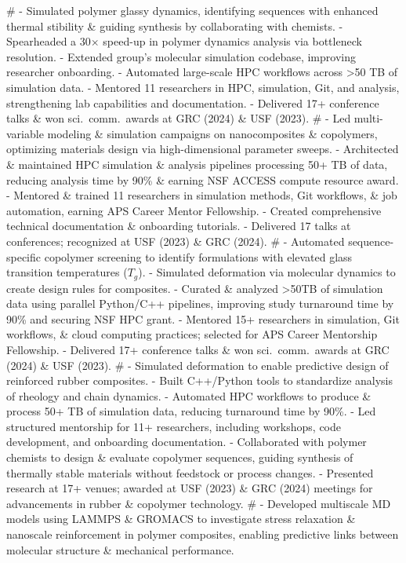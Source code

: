 #
- Simulated polymer glassy dynamics, identifying sequences with enhanced thermal stibility \& guiding synthesis by collaborating with chemists.
- Spearheaded a 30$\times$ speed-up in polymer dynamics analysis via bottleneck resolution.
- Extended group's molecular simulation codebase, improving researcher onboarding.
- Automated large-scale HPC workflows across >50 TB of simulation data.
- Mentored 11 researchers in HPC, simulation, Git, and analysis, strengthening lab capabilities and documentation.
- Delivered 17+ conference talks \& won sci.~comm.~awards at GRC (2024) \& USF (2023).
#
- Led multi-variable modeling \& simulation campaigns on nanocomposites \& copolymers, optimizing materials design via high-dimensional parameter sweeps.
- Architected \& maintained HPC simulation \& analysis pipelines processing 50+ TB of data, reducing analysis time by 90\% \& earning NSF ACCESS compute resource award.
- Mentored \& trained 11 researchers in simulation methods, Git workflows, \& job automation, earning APS Career Mentor Fellowship.
- Created comprehensive technical documentation \& onboarding tutorials.
- Delivered 17 talks at conferences; recognized at USF (2023) \& GRC (2024).
#
- Automated sequence-specific copolymer screening to identify formulations with elevated glass transition temperatures ($T_g$).
- Simulated deformation via molecular dynamics to create design rules for composites.
- Curated \& analyzed >50TB of simulation data using parallel Python/C++ pipelines, improving study turnaround time by 90\% and securing NSF HPC grant.
- Mentored 15+ researchers in simulation, Git workflows, \& cloud computing practices; selected for APS Career Mentorship Fellowship.
- Delivered 17+ conference talks \& won sci.~comm.~awards at GRC (2024) \& USF (2023).
#
- Simulated deformation to enable predictive design of reinforced rubber composites.
- Built C++/Python tools to standardize analysis of rheology and chain dynamics.
- Automated HPC workflows to produce \& process 50+ TB of simulation data, reducing turnaround time by 90\%.
- Led structured mentorship for 11+ researchers, including workshops, code development, and onboarding documentation.
- Collaborated with polymer chemists to design \& evaluate copolymer sequences, guiding synthesis of thermally stable materials without feedstock or process changes.
- Presented research at 17+ venues; awarded at USF (2023) \& GRC (2024) meetings for advancements in rubber \& copolymer technology.
#
- Developed multiscale MD models using LAMMPS \& GROMACS to investigate stress relaxation \& nanoscale reinforcement in polymer composites, enabling predictive links between molecular structure \& mechanical performance.
